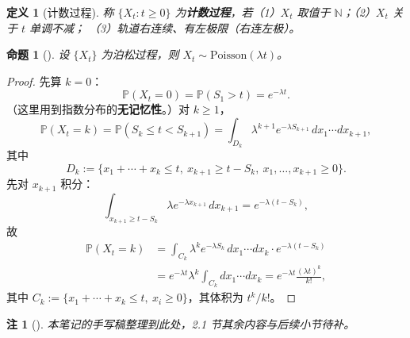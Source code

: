 \documentclass[lang=cn,10pt,newtx,thmcnt=chapter,mode=simple]{vividbook}
\providecommand{\N}{}\renewcommand{\N}{\mathbb{N}}
\providecommand{\Pp}{}\renewcommand{\Pp}{\mathbb{P}}
\theoremstyle{vividthm}
\newtheorem*{vividproposition}{命题}
\theoremstyle{vividdef}
\newtheorem*{vividdefinition}{定义}
\theoremstyle{vividexa}
\theoremstyle{vividrem}
\newtheorem*{vividremark}{注}
\renewenvironment{proposition}[1][]{\begin{vividproposition}[#1]}{\end{vividproposition}}
\renewenvironment{definition}[1][]{\begin{vividdefinition}[#1]}{\end{vividdefinition}}
\renewenvironment{remark}[1][]{\begin{vividremark}[#1]}{\end{vividremark}}
\begin{document}
\begin{definition}[计数过程]
称 $\{X_t:t\ge0\}$ 为\textbf{计数过程}，若（1）$X_t$ 取值于 $\N$；（2）$X_t$ 关于 $t$ 单调不减；
（3）轨道右连续、有左极限（右连左极）。
\end{definition}

\begin{proposition}
设 $\{X_t\}$ 为泊松过程，则 $X_t\sim\mathrm{Poisson}(\lambda t)$。
\end{proposition}

\begin{proof}
先算 $k=0$：
\[
\Pp(X_t=0)=\Pp(S_1>t)=e^{-\lambda t}.
\]
（这里用到指数分布的\textbf{无记忆性}。）对 $k\ge1$，
\[
\Pp(X_t=k)=\Pp(S_k\le t<S_{k+1})
=\int_{D_k}\lambda^{k+1}e^{-\lambda S_{k+1}}\,dx_1\cdots dx_{k+1},
\]
其中
\[
D_k:=\bigl\{x_1+\cdots+x_k\le t,\ x_{k+1}\ge t-S_k,\ x_1,\dots,x_{k+1}\ge0\bigr\}.
\]
先对 $x_{k+1}$ 积分：
\[
\int_{x_{k+1}\ge t-S_k}\lambda e^{-\lambda x_{k+1}}\,dx_{k+1}=e^{-\lambda(t-S_k)},
\]
故
\begin{align*}
\Pp(X_t=k)
&=\int_{C_k}\lambda^k e^{-\lambda S_k}\,dx_1\cdots dx_k\cdot e^{-\lambda(t-S_k)}\\
&=e^{-\lambda t}\lambda^k\int_{C_k}dx_1\cdots dx_k
=e^{-\lambda t}\frac{(\lambda t)^k}{k!},
\end{align*}
其中 $C_k:=\{x_1+\cdots+x_k\le t,\ x_i\ge0\}$，其体积为 $t^k/k!$。 \qedhere
\end{proof}

\begin{remark}
本笔记的手写稿整理到此处，2.1 节其余内容与后续小节待补。
\end{remark}
\end{document}

